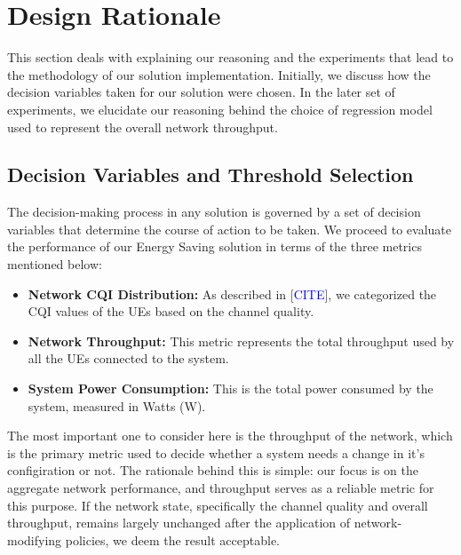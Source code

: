 \section{Design Rationale}
\label{sec:design_rationale}

This section deals with explaining our reasoning and the experiments that lead to the methodology of our solution implementation. 
Initially, we discuss how the decision variables taken for our solution were chosen.
In the later set of experiments, we elucidate our reasoning behind the choice of regression model used to represent the overall network throughput.

\subsection{Decision Variables and Threshold Selection}

The decision-making process in any solution is governed by a set of decision variables that determine the course of action to be taken.
We proceed to evaluate the performance of our Energy Saving solution in terms of the three metrics mentioned below:
\begin{itemize}
  \item \textbf{Network CQI Distribution:} As described in [\textcolor{blue}{CITE}], we categorized the CQI values of the UEs based on the channel quality.
  \item \textbf{Network Throughput:} This metric represents the total throughput used by all the UEs connected to the system.
  \item \textbf{System Power Consumption:} This is the total power consumed by the system, measured in Watts (W).
\end{itemize}

The most important one to consider here is the throughput of the network, which is the primary metric used to decide whether a system needs a change in it's configiration or not.
The rationale behind this is simple: our focus is on the aggregate network performance, and throughput serves as a reliable metric for this purpose.
If the network state, specifically the channel quality and overall throughput, remains largely unchanged after the application of network-modifying policies, we deem the result acceptable.

